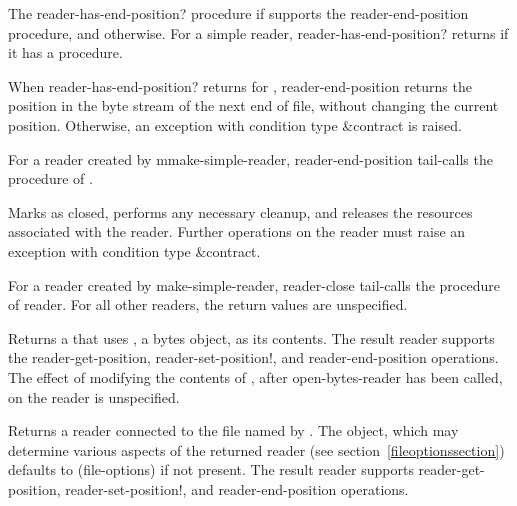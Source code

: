 \begin{entry}{%
}

The {\cf reader-has-end-position?} procedure \schtrue{} if 
supports the {\cf reader-end-position} procedure, and \schfalse{}
otherwise.  For a simple reader, {\cf reader-has-end-position?}
returns \schtrue{} if it has a  procedure.
   
When {\cf reader-has-end-position?} returns \schtrue{} for
, {\cf reader-end-position} returns the position in the
byte stream of the next end of file, without changing the current
position.  Otherwise, an exception with condition type {\cf\&contract}
is raised.

For a reader created by {\cf mmake-simple-reader}, {\cf
  reader-end-position} tail-calls the  procedure of
.
\end{entry}

\begin{entry}{%
}
   
Marks  as closed, performs any necessary cleanup, and
releases the resources associated with the reader. Further operations
on the reader must raise an exception with condition type
{\cf\&contract}.
   
For a reader created by {\cf make-simple-reader}, {\cf reader-close} tail-calls the
 procedure of reader.  For all other readers, the return
values are unspecified.
\end{entry}

\begin{entry}{%
}

Returns a  that uses 
, a bytes object, as its contents. The result reader supports
the {\cf reader-get-position}, {\cf reader-set-position!}, and {\cf reader-end-position}
operations.
The effect of modifying the contents of , after 
{\cf open-bytes-reader} has been called, on the reader is unspecified.
\end{entry}

\begin{entry}{%
}
   
Returns a reader connected to the file named by .
The  object, which may determine various aspects of the returned reader
(see section~\ref{fileoptionssection}) defaults to {\cf (file-options)} if not
present.
The result reader supports {\cf reader-get-position},
{\cf reader-set-position!}, and {\cf reader-end-position} operations.
\end{entry} 

